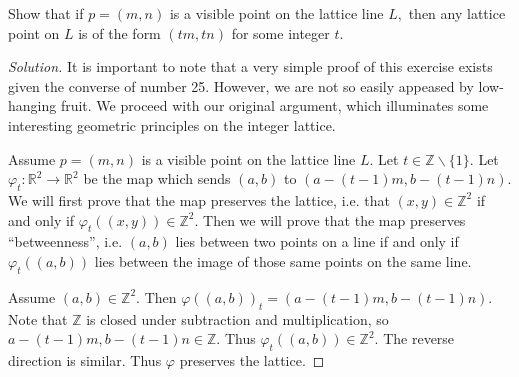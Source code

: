 \documentclass[12pt]{article}
\newcommand{\Z}{\mathbb{Z}}
\newcommand{\R}{\mathbb{R}}
\newenvironment{exercise}[2][Exercise]{\begin{trivlist}
        \item[\hskip \labelsep {\bfseries #1}\hskip \labelsep {\bfseries #2.}]}{\end{trivlist}}
\newenvironment{solution}
        {\begin{proof}[Solution]}
                    {\end{proof}}
\begin{document}
\begin{exercise}{26}
    Show that if \( p = ( m,n ) \) is a visible point on the lattice line \( L, \) then any lattice point on \( L \) is of the form \( ( tm,tn ) \) for some integer \( t. \)
    \begin{solution}
        It is important to note that a very simple proof of this exercise exists given the converse of number 25. However, we are not so easily appeased by low-hanging fruit. We proceed with our original argument, which illuminates some interesting geometric principles on the integer lattice.

        Assume \( p = ( m,n ) \) is a visible point on the lattice line \( L. \) Let \( t \in \Z \backslash \{ 1 \} . \) Let \( \varphi_{t}  : \R^{2} \to \R^{2} \) be the map which sends \( ( a,b ) \) to \( ( a - (t-1)m ,b - (t-1)n)  \). We will first prove that the map preserves the lattice, i.e. that \( ( x,y ) \in \Z^{2} \) if and only if \( \varphi_{t}(( x,y )) \in \Z^{2}  \). Then we will prove that the map preserves ``betweenness'', i.e. \( ( a,b ) \) lies between two points on a line if and only if \( \varphi_{t} (( a,b )) \) lies between the image of those same points on the same line.

        Assume \( ( a,b ) \in \Z^{2} . \) Then \( \varphi(( a,b ))_{t}  = ( a - (t-1)m, b-(t-1)n ) . \) Note that \( \Z \) is closed under subtraction and multiplication, so \( a-(t-1)m, b-(t-1)n \in \Z. \) Thus \( \varphi_{t} (( a,b )) \in \Z^{2} . \) The reverse direction is similar. Thus \( \varphi \) preserves the lattice.


\end{solution}
\end{exercise}
\end{document}
